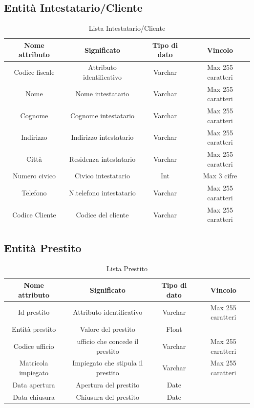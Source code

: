\documentclass[12pt]{article}
\begin{document}

\subsection*{Entità Intestatario/Cliente}
\begin{table}[h!]
    \centering
    \begin{tabular}{|c|c|c|c|}
        \hline
        Nome attributo & Significato & Tipo di dato & Vincolo \\
        \hline
        Codice fiscale & Attributo identificativo & Varchar & Max 255 caratteri \\
        \hline
        Nome & Nome intestatario & Varchar & Max 255 caratteri \\
        \hline
        Cognome & Cognome intestatario & Varchar & Max 255 caratteri \\
        \hline
        Indirizzo & Indirizzo intestatario & Varchar & Max 255 caratteri \\
        \hline
        Città & Residenza intestatario & Varchar & Max 255 caratteri \\
        \hline
        Numero civico & Civico intestatario & Int & Max 3 cifre \\
        \hline
        Telefono & N.telefono intestatario & Varchar & Max 255 caratteri \\
        \hline
        Codice Cliente & Codice del cliente & Varchar & Max 255 caratteri \\
        \hline
    \end{tabular}
    \caption{Lista Intestatario/Cliente}
    \label{tab:my_label}
\end{table}


\subsection*{Entità Prestito}
\begin{table}[h!]
    \centering
    \begin{tabular}{|c|c|c|c|}
        \hline
        Nome attributo & Significato & Tipo di dato & Vincolo \\
        \hline
        Id prestito & Attributo identificativo & Varchar & Max 255 caratteri \\
        \hline
        Entità prestito & Valore del prestito & Float & \\
        \hline 
        Codice ufficio & ufficio che concede il prestito & Varchar & Max 255 caratteri \\
        \hline
        Matricola impiegato & Impiegato che stipula il prestito & Varchar & Max 255 caratteri \\
        \hline
        Data apertura & Apertura del prestito & Date & \\
        \hline 
        Data chiusura & Chiusura del prestito & Date & \\
        \hline
    \end{tabular}
    \caption{Lista Prestito}
    \label{tab:my_label}
\end{table}
\end{document}
